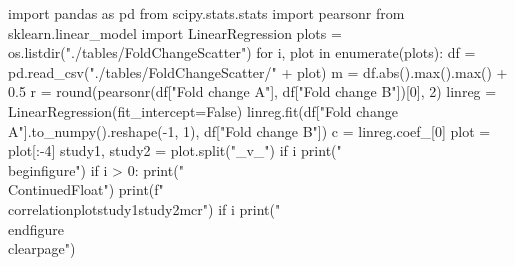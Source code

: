 \begin{pycode}
import pandas as pd
from scipy.stats.stats import pearsonr
from sklearn.linear_model import LinearRegression
plots = os.listdir("./tables/FoldChangeScatter")
for i, plot in enumerate(plots):
    df = pd.read_csv("./tables/FoldChangeScatter/" + plot)
    m = df.abs().max().max() + 0.5
    r = round(pearsonr(df["Fold change A"], df["Fold change B"])[0], 2)
    linreg = LinearRegression(fit_intercept=False)
    linreg.fit(df["Fold change A"].to_numpy().reshape(-1, 1), df["Fold change B"])
    c = linreg.coef_[0]
    plot = plot[:-4]
    study1, study2 = plot.split("_v_")
    if i %
        print("\\begin{figure}")
        if i > 0:
            print("\\ContinuedFloat")
    print(f"\\correlationplot{{{study1}}}{{{study2}}}{{{m}}}{{{c}}}{{{r}}}")
    if i %
        print("\\end{figure}\\clearpage")
\end{pycode}

\fi
